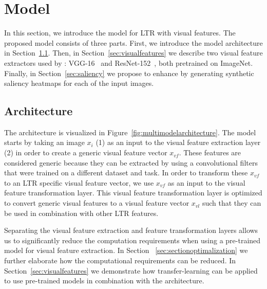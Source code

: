 
\section{\protect\modelname{} Model}
In this section, we introduce the \modelname{} model for \ac{LTR} with visual features.
The proposed model consists of three parts.
First, we introduce the model architecture in Section~\ref{sec:multimodal}.
Then, in Section~\ref{sec:visualfeatures} we describe two visual feature extractors used by \modelname{}:
VGG-16~\cite{simonyan2014very} and ResNet-152~\cite{he2016deep}, both pretrained on ImageNet.
Finally, in Section~\ref{sec:saliency} we propose to enhance \modelname{} by generating synthetic saliency heatmaps for each of the input images.

\subsection{Architecture} \label{sec:multimodal}
The \modelname{} architecture is visualized in Figure~\ref{fig:multimodelarchitecture}. 
The model starts by taking an image $x_i$ (1) as an input to the visual feature extraction layer (2) in order to create a generic visual feature vector $x_{vf}$. 
These features are considered generic because they can be extracted by using a convolutional filters that were trained on a different dataset and task. 
In order to transform these $x_{vf}$ to an \ac{LTR} specific visual feature vector, we use $x_{vf}$ as an input to the visual feature transformation layer.
This visual feature transformation layer is optimized to convert generic visual features to a visual feature vector $x_{vl}$ such that they can be used in combination with other \ac{LTR} features. 

Separating the visual feature extraction and feature transformation layers allows us to significantly reduce the computation requirements when using a pre-trained model for visual feature extraction. 
In Section ~\ref{sec:sectionoptimalization} we further elaborate how the computational requirements can be reduced. In Section~\ref{sec:visualfeatures} we demonstrate how transfer-learning can be applied to use pre-trained models in combination with the \modelname{} architecture.

